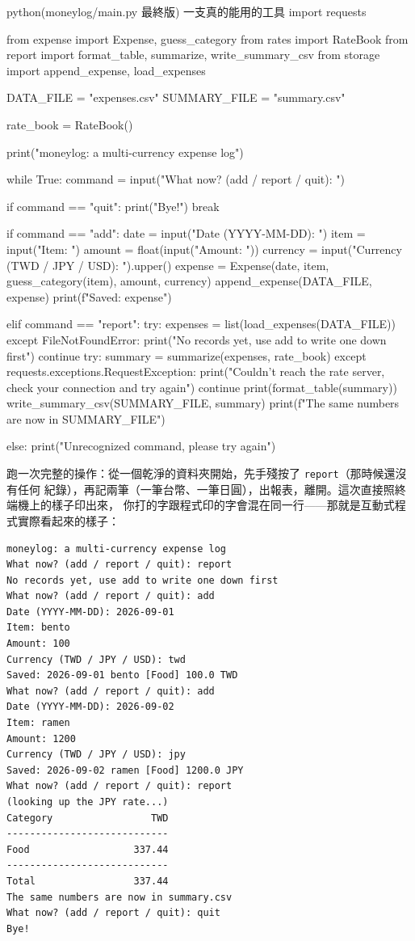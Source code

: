 \begin{example}{python}{(moneylog/main.py 最終版) 一支真的能用的工具}
import requests

from expense import Expense, guess_category
from rates import RateBook
from report import format_table, summarize, write_summary_csv
from storage import append_expense, load_expenses

DATA_FILE = "expenses.csv"
SUMMARY_FILE = "summary.csv"

rate_book = RateBook()

print("moneylog: a multi-currency expense log")

while True:
    command = input("What now? (add / report / quit): ")

    if command == "quit":
        print("Bye!")
        break

    if command == "add":
        date = input("Date (YYYY-MM-DD): ")
        item = input("Item: ")
        amount = float(input("Amount: "))
        currency = input("Currency (TWD / JPY / USD): ").upper()
        expense = Expense(date, item, guess_category(item), amount, currency)
        append_expense(DATA_FILE, expense)
        print(f"Saved: {expense}")

    elif command == "report":
        try:
            expenses = list(load_expenses(DATA_FILE))
        except FileNotFoundError:
            print("No records yet, use add to write one down first")
            continue
        try:
            summary = summarize(expenses, rate_book)
        except requests.exceptions.RequestException:
            print("Couldn't reach the rate server, check your connection and try again")
            continue
        print(format_table(summary))
        write_summary_csv(SUMMARY_FILE, summary)
        print(f"The same numbers are now in {SUMMARY_FILE}")

    else:
        print("Unrecognized command, please try again")
\end{example}

跑一次完整的操作：從一個乾淨的資料夾開始，先手殘按了 \texttt{report}（那時候還沒有任何
紀錄），再記兩筆（一筆台幣、一筆日圓），出報表，離開。這次直接照終端機上的樣子印出來，
你打的字跟程式印的字會混在同一行——那就是互動式程式實際看起來的樣子：

\begin{verbatim}
moneylog: a multi-currency expense log
What now? (add / report / quit): report
No records yet, use add to write one down first
What now? (add / report / quit): add
Date (YYYY-MM-DD): 2026-09-01
Item: bento
Amount: 100
Currency (TWD / JPY / USD): twd
Saved: 2026-09-01 bento [Food] 100.0 TWD
What now? (add / report / quit): add
Date (YYYY-MM-DD): 2026-09-02
Item: ramen
Amount: 1200
Currency (TWD / JPY / USD): jpy
Saved: 2026-09-02 ramen [Food] 1200.0 JPY
What now? (add / report / quit): report
(looking up the JPY rate...)
Category                 TWD
----------------------------
Food                  337.44
----------------------------
Total                 337.44
The same numbers are now in summary.csv
What now? (add / report / quit): quit
Bye!
\end{verbatim}

